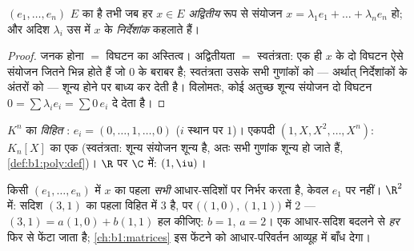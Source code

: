 \begin{proposition}[निर्देशांक]\label{prop:b1:vspaces:coordinates}
$(e_1, \dots, e_n)$ $E$ का  है तभी जब हर $x \in E$ \emph{अद्वितीय} रूप
से संयोजन $x = \lambda_1 e_1 + \dots + \lambda_n e_n$ हो; और अदिश
$\lambda_i$ उस  में $x$ के \emph{निर्देशांक} कहलाते
हैं।
\end{proposition}

\begin{proof}
जनक होना $=$ विघटन का अस्तित्व। अद्वितीयता $=$ स्वतंत्रता: एक ही $x$ के दो
विघटन ऐसे संयोजन जितने भिन्न होते हैं जो $0$ के बराबर है; स्वतंत्रता उसके
सभी गुणांकों को --- अर्थात् निर्देशांकों के अंतरों को --- शून्य होने पर
बाध्य कर देती है। विलोमतः, कोई अतुच्छ शून्य संयोजन दो विघटन $0 = \sum
\lambda_i e_i = \sum 0\,e_i$ दे देता है।
\end{proof}

\begin{example}\label{ex:b1:vspaces:bases}
$K^n$ का \emph{विहित }: $e_i = (0, \dots, 1, \dots, 0)$ ($i$ स्थान पर
$1$)। एकपदी $(1, X, X^2, \dots, X^n)$: $K_n[X]$ का एक  (स्वतंत्रता:
शून्य संयोजन शून्य  है, अतः सभी गुणांक शून्य हो जाते हैं,
\cref{def:b1:poly:def})। $\R$ पर $\C$ में:  $(1, \iu)$।
\end{example}

\begin{remark}[निर्देशांक सामूहिक परिश्रम हैं]
\label{rem:b1:vspaces:teameffort}
किसी  $(e_1, \dots, e_n)$ में $x$ का पहला  \emph{सभी}
आधार-सदिशों पर निर्भर करता है, केवल $e_1$ पर नहीं। $\R^2$ में: सदिश $(3, 1)$
का पहला  विहित  में $3$ है, पर  $\bigl((1,0), (1,1)\bigr)$
में $2$ --- $(3,1) = a(1,0) + b(1,1)$ हल कीजिए: $b = 1$, $a = 2$। एक
आधार-सदिश बदलने से \emph{हर}  फिर से फेंटा जाता है;
\cref{ch:b1:matrices} इस फेंटने को आधार-परिवर्तन आव्यूह में बाँध देगा।
\end{remark}

